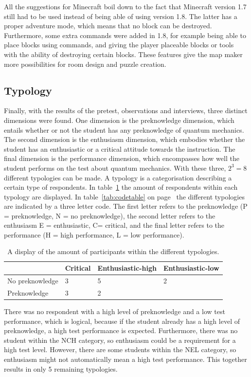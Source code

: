\documentclass[11pt,twoside]{report} %
\begin{document}
All the suggestions for Minecraft boil down to the fact that Minecraft version 1.7 still had to be used instead of being able of using version 1.8. The latter has a proper adventure mode, which means that no block can be destroyed. Furthermore, some extra commands were added in 1.8, for example being able to place blocks using commands, and giving the player placeable blocks or tools with the ability of destroying certain blocks. These features give the map maker more possibilities for room design and puzzle creation.

\subsection{Typology}

Finally, with the results of the pretest, observations and interviews, three distinct dimensions were found. One dimension is the preknowledge dimension, which entails whether or not the student has any preknowledge of quantum mechanics. The second dimension is the enthusiasm dimension, which embodies whether the student has an enthusiastic or a critical attitude towards the instruction. The final dimension is the performance dimension, which encompasses how well the student performs on the test about quantum mechanics. With these three, $2^3=8$ different typologies can be made. A typology is a categorisation describing a certain type of respondents. In table~\ref{tab:typology} the amount of respondents within each typology are displayed. In table~\ref{tab:codetable} on page~\pageref{tab:codetable} the different typologies are indicated by a three letter code. The first letter refers to the preknowledge (P = preknowledge, N = no preknowledge), the second letter refers to the enthusiasm {E = enthusiastic, C= critical}, and the final letter refers to the performance (H = high performance, L = low performance).

\begin{table}[htbp]
\begin{tabular}{|l|l|l|l|}
\hline
 & Critical & Enthusiastic-high & Enthusiastic-low \\ \hline
No preknowledge & 3 & 5 & 2 \\ \hline
Preknowledge & 3 & 2 &  \\ \hline
\end{tabular}
\caption{A display of the amount of participants within the different typologies.\label{tab:typology}}
\end{table}

There was no respondent with a high level of preknowledge and a low test performance, which is logical, because if the student already has a high level of preknowledge, a high test performance is expected. Furthermore, there was no student within the NCH category, so enthusiasm could be a requirement for a high test level. However, there are some students within the NEL category, so enthusiasm might not automatically mean a high test performance. This together results in only 5 remaining typologies.
\end{document}
